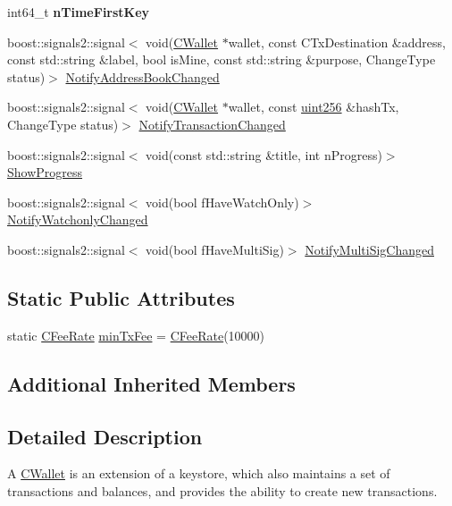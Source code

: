 \begin{DoxyCompactItemize}
int64\+\_\+t {\bfseries n\+Time\+First\+Key}
\item 
boost\+::signals2\+::signal$<$ void(\mbox{\hyperlink{class_c_wallet}{C\+Wallet}} $\ast$wallet, const C\+Tx\+Destination \&address, const std\+::string \&label, bool is\+Mine, const std\+::string \&purpose, Change\+Type status)$>$ \mbox{\hyperlink{class_c_wallet_a8fc5f64f33f91353ed443d9897529c05}{Notify\+Address\+Book\+Changed}}
\item 
boost\+::signals2\+::signal$<$ void(\mbox{\hyperlink{class_c_wallet}{C\+Wallet}} $\ast$wallet, const \mbox{\hyperlink{classuint256}{uint256}} \&hash\+Tx, Change\+Type status)$>$ \mbox{\hyperlink{class_c_wallet_a4cc32526b4e90faadf11a9bd022a956f}{Notify\+Transaction\+Changed}}
\item 
boost\+::signals2\+::signal$<$ void(const std\+::string \&title, int n\+Progress)$>$ \mbox{\hyperlink{class_c_wallet_afa895ec96ad91fff551b4b9daf6ad4a6}{Show\+Progress}}
\item 
boost\+::signals2\+::signal$<$ void(bool f\+Have\+Watch\+Only)$>$ \mbox{\hyperlink{class_c_wallet_abaeed8c343b4044453a4dd6ac08be906}{Notify\+Watchonly\+Changed}}
\item 
boost\+::signals2\+::signal$<$ void(bool f\+Have\+Multi\+Sig)$>$ \mbox{\hyperlink{class_c_wallet_a26c4403efbfe8797d8bd386e6ac2de15}{Notify\+Multi\+Sig\+Changed}}
\end{DoxyCompactItemize}
\subsection*{Static Public Attributes}
\begin{DoxyCompactItemize}
\item 
static \mbox{\hyperlink{class_c_fee_rate}{C\+Fee\+Rate}} \mbox{\hyperlink{class_c_wallet_ab60ceb8041d1f9cecc70b19d2317c686}{min\+Tx\+Fee}} = \mbox{\hyperlink{class_c_fee_rate}{C\+Fee\+Rate}}(10000)
\end{DoxyCompactItemize}
\subsection*{Additional Inherited Members}


\subsection{Detailed Description}
A \mbox{\hyperlink{class_c_wallet}{C\+Wallet}} is an extension of a keystore, which also maintains a set of transactions and balances, and provides the ability to create new transactions. 

